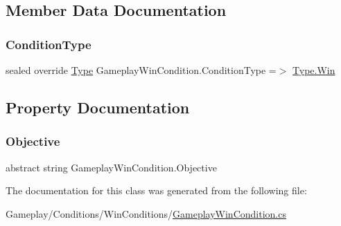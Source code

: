 \subsection{Member Data Documentation}
\mbox{\label{class_gameplay_win_condition_a388f170d486b12e620424f790e897804}} 
\subsubsection{\texorpdfstring{Condition\+Type}{ConditionType}}
{\footnotesize\ttfamily sealed override \mbox{\hyperlink{class_gameplay_condition_af7549fe9ce5328062dab831d05ca9702}{Type}} Gameplay\+Win\+Condition.\+Condition\+Type =$>$ \mbox{\hyperlink{class_gameplay_condition_af7549fe9ce5328062dab831d05ca9702a119eac47719cc9be7b99124712e229da}{Type.\+Win}}}



\subsection{Property Documentation}
\mbox{\label{class_gameplay_win_condition_a2dc8db4dc7f3307032166895be15fed3}} 
\subsubsection{\texorpdfstring{Objective}{Objective}}
{\footnotesize\ttfamily abstract string Gameplay\+Win\+Condition.\+Objective\hspace{0.3cm}{\ttfamily [get]}}



The documentation for this class was generated from the following file\+:\begin{DoxyCompactItemize}
\item 
Gameplay/\+Conditions/\+Win\+Conditions/\mbox{\hyperlink{_gameplay_win_condition_8cs}{Gameplay\+Win\+Condition.\+cs}}\end{DoxyCompactItemize}
